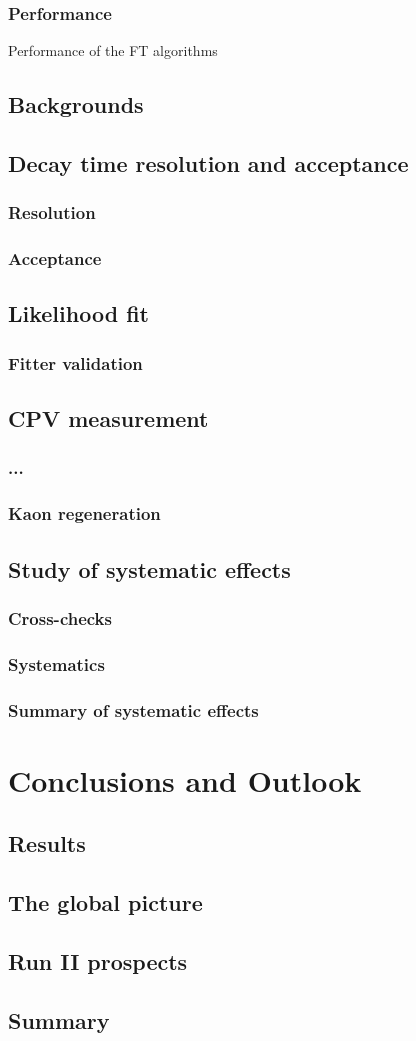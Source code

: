 \subsection{Performance}
Performance of the FT algorithms

\section{Backgrounds}
\section{Decay time resolution and acceptance}
\subsection{Resolution}
\subsection{Acceptance}
\section{Likelihood fit}
\subsection{Fitter validation}
\section{CPV measurement}
\subsection{...}
\subsection{Kaon regeneration}
\section{Study of systematic effects}
\subsection{Cross-checks}
\subsection{Systematics}
\subsection{Summary of systematic effects}

\chapter{Conclusions and Outlook}
\section{Results}
\section{The global picture}
\section{Run II prospects}
\section{Summary}
